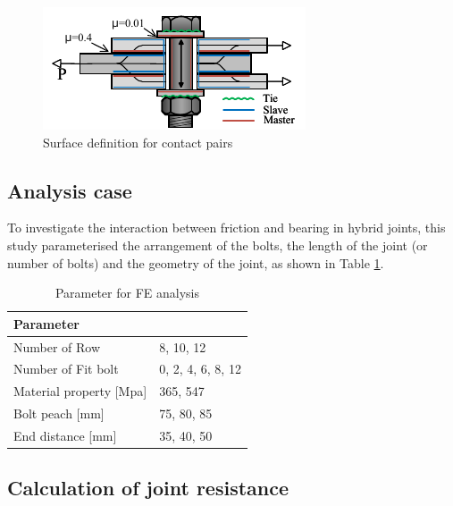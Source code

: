 \begin{figure}[htbp]
    \centering
    \includegraphics[width=0.5\linewidth]{imgs/ch7/contactp.pdf}
    \caption{Surface definition for contact pairs}
    \label{fig-contactp}
\end{figure}

\subsection{Analysis case}
To investigate the interaction between friction and bearing in hybrid joints, this study parameterised the arrangement of the bolts, the length of the joint (or number of bolts) and the geometry of the joint, as shown in Table \ref{tab-cases}.

\begin{table}[]
    \centering
\caption{Parameter for FE analysis}
\begin{tabular}{@{}ll@{}}
\toprule
Parameter                   &              \\ \midrule
Number of Row               & 8, 10, 12      \\
Number of Fit bolt          & 0, 2, 4, 6, 8, 12 \\
Material property {[}Mpa{]} & 365, 547     \\
Bolt peach [mm]             & 75, 80, 85     \\
End distance  [mm]          & 35, 40, 50     \\ \bottomrule
\end{tabular}
\label{tab-cases}
\end{table}

\subsection{Calculation of joint resistance}

